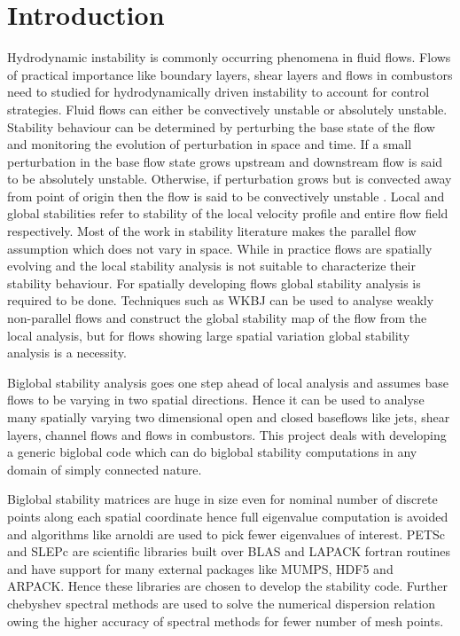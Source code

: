 \documentclass[pdftex,12pt,a4paper,oneside]{report}
\begin{document}
\chapter{Introduction}
\hspace{1.00cm} Hydrodynamic instability is commonly occurring phenomena in fluid flows. Flows of practical importance like boundary layers,
shear layers and flows in combustors need to studied for hydrodynamically driven instability to account for control strategies.
Fluid flows can either be convectively unstable or absolutely unstable. Stability behaviour can be determined by perturbing the base state of
the flow and monitoring the evolution of perturbation in space and time. If a small perturbation in the base flow state
grows upstream and downstream flow is said to be absolutely unstable. Otherwise, if perturbation grows but is convected 
away from point of origin then the flow is said to be convectively unstable \cite{huerre90}. Local and global stabilities refer to 
stability of the local velocity profile and entire flow field respectively. Most of the work in stability literature makes the parallel flow assumption
which does not vary in space. While in practice flows are spatially evolving and the local stability analysis is not suitable to characterize
their stability behaviour. For spatially developing flows global stability analysis is required to be done. Techniques such as WKBJ can be used 
to analyse weakly non-parallel flows and construct the global stability map of the flow from the local analysis, but for flows showing large spatial
variation global stability analysis is a necessity.

Biglobal stability analysis goes one step ahead of local analysis and assumes base flows to be varying in two spatial directions. Hence it can be used
to analyse many spatially varying two dimensional open and closed baseflows like jets, shear layers, channel flows and flows in combustors. This project deals with 
developing a generic biglobal code which can do biglobal stability computations in any domain of simply connected nature. 

Biglobal stability matrices are huge
in size even for nominal number of discrete points along each spatial coordinate hence full eigenvalue computation is avoided and algorithms like arnoldi are used
to pick fewer eigenvalues of interest. PETSc and SLEPc are scientific libraries built over BLAS and LAPACK fortran routines and have support for many external packages like MUMPS, HDF5 and ARPACK. Hence these libraries are chosen to develop the stability code. Further chebyshev spectral methods are used to solve the numerical dispersion relation owing the higher accuracy of
spectral methods for fewer number of mesh points.
\setcounter{page}{1}
\end{document}
